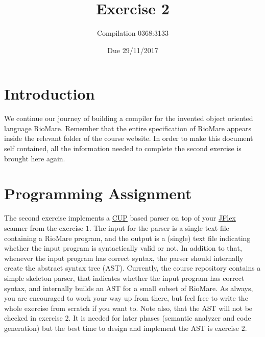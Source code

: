 \documentclass{article}
\begin{document}
\title{Exercise 2}

\author{Compilation 0368:3133}

\date{Due 29/11/2017}

\maketitle

\section{Introduction}
We continue our journey of building a compiler
for the invented object oriented language RioMare.
Remember that the entire specification of RioMare appears
inside the relevant folder of the course website.
In order to make this document self contained,
all the information needed to complete the second exercise is brought here again.
\section{Programming Assignment}
The second exercise implements a \href{http://www2.cs.tum.edu/projects/cup/}{CUP} based
parser on top of your \href{http://jflex.de/}{JFlex} scanner from the exercise $1$.
The input for the parser is a single text file containing a RioMare program,
and the output is a (single) text file indicating whether the input program
is syntactically valid or not. In addition to that,
whenever the input program has correct syntax,
the parser should internally create the abstract syntax tree (AST).
Currently, the course repository contains a simple skeleton
parser, that indicates whether the input program has correct syntax,
and internally builds an AST for a small subset of RioMare.
As always, you are encouraged to work your way up from there,
but feel free to write the whole exercise from scratch if you want to.
Note also, that the AST will not be checked in exercise $2$.
It is needed for later phases (semantic analyzer and code generation)
but the best time to design and implement the AST is exercise $2$.
\end{document}
